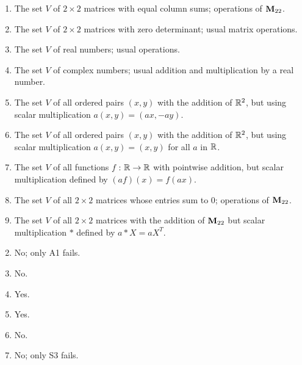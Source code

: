 \begin{multicols}{2}
\begin{ex}
\begin{enumerate}[label={\alph*.}]
\item The set $V$ of $2 \times 2$ matrices with equal column sums; operations of $\textbf{M}_{22}$.

\item The set $V$ of $2 \times 2$ matrices with zero determinant; usual matrix operations.

\item The set $V$ of real numbers; usual operations.

\item The set $V$ of complex numbers; usual addition and multiplication by a real number.

\item The set $V$ of all ordered pairs $(x, y)$ with the addition of $\mathbb{R}^2$, but using scalar multiplication $a(x, y) = (ax, -ay)$.

\item The set $V$ of all ordered pairs $(x, y)$ with the addition of $\mathbb{R}^2$, but using scalar multiplication $a(x, y) = (x, y)$ for all $a$ in $\mathbb{R}$.

\item The set $V$ of all functions $f$ : $\mathbb{R} \to \mathbb{R}$ with pointwise addition, but scalar multiplication defined by $(af)(x) = f(ax)$.

\item The set $V$ of all $2 \times 2$ matrices whose entries sum to $0$; operations of $\textbf{M}_{22}$.

\item The set $V$ of all $2 \times 2$ matrices with the addition of $\textbf{M}_{22}$ but scalar multiplication $*$ defined by $a * X = aX^{T}$.

\end{enumerate}
\begin{sol}
\begin{enumerate}[label={\alph*.}]
\setcounter{enumi}{1}
\item  No; only A1 fails.

\setcounter{enumi}{3}
\item  No.

\setcounter{enumi}{5}
\item  Yes.

\setcounter{enumi}{7}
\item  Yes.

\setcounter{enumi}{9}
\item  No.

\setcounter{enumi}{11}
\item  No; only S3 fails.


\end{enumerate}
\end{sol}
\end{ex}
\end{multicols}
